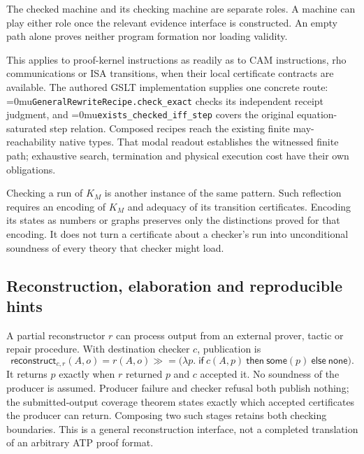 \documentclass[11pt,a4paper]{article}
\newcommand{\name}[1]{\textup{\Urlmuskip=0mu\relax\nolinkurl{#1}}}
\newcommand{\diagramcaption}[1]{\par{\small\color{ink}#1\par}\medskip}
\begin{document}
\begin{center}
\end{center}
\diagramcaption{The checked machine and its checking machine are separate
roles. A machine can play either role once the relevant evidence interface is
constructed. An empty path alone proves neither program formation nor loading
validity.}

This applies to proof-kernel instructions as readily as to CAM instructions,
rho communications or ISA transitions, when their local certificate contracts
are available. The authored GSLT implementation supplies one concrete route:
\name{GeneralRewriteRecipe.check_exact} checks its independent receipt
judgment, and \name{exists_checked_iff_step} covers the original
equation-saturated step relation. Composed recipes reach the existing finite
may-reachability native types. That modal readout establishes the witnessed
finite path; exhaustive search, termination and physical execution cost have
their own obligations.

Checking a run of $K_M$ is another instance of the same pattern. Such reflection
requires an encoding of $K_M$ and adequacy of its transition certificates.
Encoding its states as numbers or graphs preserves only the distinctions
proved for that encoding. It does not turn a certificate about a checker's run
into unconditional soundness of every theory that checker might load.

\subsection{Reconstruction, elaboration and reproducible hints}

A partial reconstructor $r$ can process output from an external prover,
tactic or repair procedure. With destination checker $c$, publication is
\[
 \mathsf{reconstruct}_{c,r}(A,o)=
 r(A,o)\mathbin{\gg\!=}
  \bigl(\lambda p.\;\mathsf{if}\ c(A,p)\ \mathsf{then}\ \mathsf{some}(p)
      \ \mathsf{else}\ \mathsf{none}\bigr).
\]
It returns $p$ exactly when $r$ returned $p$ and $c$ accepted it. No soundness
of the producer is assumed. Producer failure and checker refusal both publish
nothing; the submitted-output coverage theorem states exactly which accepted
certificates the producer can return. Composing two such stages retains both
checking boundaries. This is a general reconstruction interface, not a
completed translation of an arbitrary ATP proof format.
\end{document}
